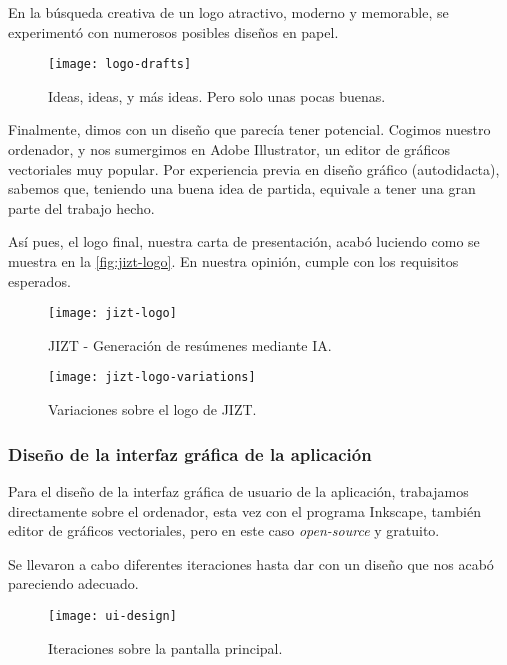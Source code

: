 En la búsqueda creativa de un logo atractivo, moderno y memorable, se experimentó con numerosos posibles diseños en papel.

\begin{figure}[h!]
	\centering
	\texttt{[image: logo-drafts]}
	\vspace{-0.5cm}
	\caption{Ideas, ideas, y más ideas. Pero solo unas pocas buenas.}
\end{figure}

Finalmente, dimos con un diseño que parecía tener potencial. Cogimos nuestro ordenador, y nos sumergimos en Adobe Illustrator, un editor de gráficos vectoriales muy popular. Por experiencia previa en diseño gráfico (autodidacta), sabemos que, teniendo una buena idea de partida, equivale a tener una gran parte del trabajo hecho.

Así pues, el logo final, nuestra carta de presentación, acabó luciendo como se muestra en la \autoref{fig:jizt-logo}. En nuestra opinión, cumple con los requisitos esperados.

\newpage

\begin{figure}[h!]
	\centering
	\texttt{[image: jizt-logo]}
	\caption{JIZT - Generación de resúmenes mediante IA.}
	\label{fig:jizt-logo}
\end{figure}

\vspace{0.3cm}

\begin{figure}[H]
	\centering
	\texttt{[image: jizt-logo-variations]}
	\caption{Variaciones sobre el logo de JIZT.}
\end{figure}

\newpage

\subsubsection{Diseño de la interfaz gráfica de la aplicación}

Para el diseño de la interfaz gráfica de usuario de la aplicación, trabajamos directamente sobre el ordenador, esta vez con el programa Inkscape, también editor de gráficos vectoriales, pero en este caso \emph{open-source} y gratuito.

Se llevaron a cabo diferentes iteraciones hasta dar con un diseño que nos acabó pareciendo adecuado.

\bigskip

\begin{figure}[h!]
	\centering
	\texttt{[image: ui-design]}
	\vspace{-0.5cm}
	\caption{Iteraciones sobre la pantalla principal.}
\end{figure}


